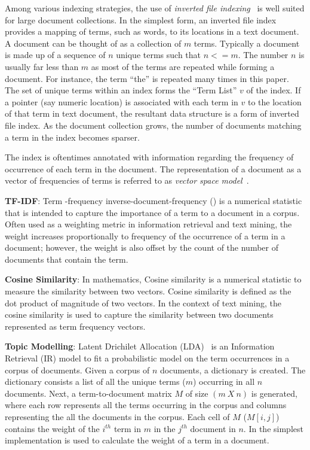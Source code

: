 Among various indexing strategies,
the use of \textit{inverted file indexing}~\cite{frakes1992introduction}
is well suited for large document collections.
In the simplest form, an inverted file index provides
a mapping of terms, such as words, to its locations in a text document.
A document can be thought of as a collection of $m$ terms.
Typically a document is made up of a sequence of $n$ unique terms
such that $n <= m$.
The number $n$ is usually far less than
$m$ as most of the terms are repeated while forming a document. 
For instance, the term ``the'' is repeated many times in this paper.
The set of unique terms within an index forms
the ``Term List'' $v$ of the index.
If a pointer (say numeric location) is associated with each term in $v$ to the location
of that term in text document, the resultant data structure
is a form of inverted file index.
As the document collection grows,
the number of documents matching a term in the index becomes sparser.

The index is oftentimes annotated with information regarding 
the frequency of occurrence of each term in the document. 
The representation of a document as a vector of frequencies
of terms is referred to as \textit{vector space model}~\cite{singhal2001modern,frakes1992introduction}.

\textbf{TF-IDF}\cite{manning2008introduction}:
Term -frequency inverse-document-frequency () is a numerical statistic that is intended to capture the importance of a term to a document in a corpus.
Often used as a weighting metric in information retrieval and text mining,
the  weight increases proportionally to frequency of the occurrence of a term in a document; however, the weight is also offset by the count of the number of documents that contain the term.

\textbf{Cosine Similarity}\cite{singhal2001modern}: In mathematics, Cosine similarity is a numerical statistic to measure the similarity between two vectors.
Cosine similarity is defined as the dot product of magnitude of two vectors.
In the context of text mining, the cosine similarity is used to capture the similarity between two documents represented as term frequency vectors.

\textbf{Topic Modelling}: Latent Drichilet Allocation (LDA)~\cite{blei2003latent,panichella2013effectively} is an Information Retrieval (IR) 
model to fit a probabilistic model on the term occurrences in a corpus of documents.
Given a corpus of $n$ documents, a dictionary is created.
The dictionary consists a list of all the unique terms ($m$) occurring in all $n$ documents.
Next, a term-to-document matrix $M$ of size $(m\ X\ n)$ is generated, where each row represents all the terms occurring in the corpus and columns representing the all the documents in the corpus.
Each cell of $M$ ($M[i,j]$) contains the weight of the $i^{th}$ term in $m$ in the $j^{th}$ document in $n$.
In the simplest implementation  is used to calculate the weight of a term in a document.


